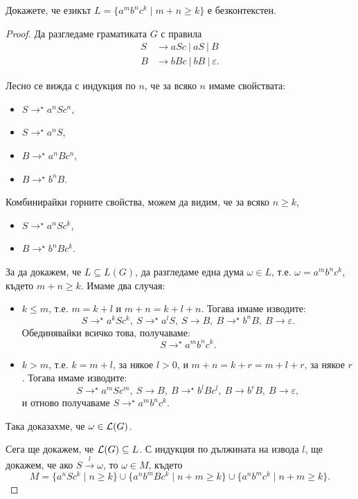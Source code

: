 \begin{problem}
  Докажете, че езикът $L = \{a^mb^nc^k\mid m+n \geq k\}$ е безконтекстен.
\end{problem}
\begin{proof}
  Да разгледаме граматиката $G$ с правила
  \begin{align*}
    S& \rightarrow aSc\ |\ aS\ |\ B\\
    B& \rightarrow bBc\ |\  bB\ |\ \varepsilon.
  \end{align*}
  
  Лесно се вижда с индукция по $n$, че за всяко $n$ имаме свойствата:
  \begin{itemize}
  \item 
    $S \rightarrow^\star a^nSc^n$,
  \item
    $S \rightarrow^\star a^nS$,
  \item
    $B \rightarrow^\star a^nBc^n$,
  \item
    $B \rightarrow^\star b^nB$.
  \end{itemize}
  Комбинирайки горните свойства, можем да видим, че за всяко $n \geq k$,
  \begin{itemize}
  \item 
    $S \rightarrow^\star a^nSc^k$,
  \item
    $B \rightarrow^\star b^nBc^k$.
  \end{itemize}
  За да докажем, че $L \subseteq L(G)$, 
  да разгледаме една дума $\omega \in L$, т.е. $\omega = a^mb^nc^k$, където $m+n \geq k$.
  Имаме два случая:
  \begin{itemize}
  \item 
    $k \leq m$, т.е. $m = k+l$ и $m+n = k+l+n$.
    Тогава имаме изводите:
    \[S \rightarrow^\star a^kSc^k,\ S \rightarrow^\star a^lS,\ S \rightarrow B,\ B \rightarrow^\star b^nB,\ B \rightarrow \varepsilon.\]
    Обединявайки всичко това, получаваме:
    \[S \rightarrow^\star a^mb^nc^k.\]
  \item
    $k > m$, т.е. $k = m+l$, за някое $l > 0$, и $m+n = k+r = m+l+r$, за някое $r$.
    Тогава имаме изводите:
    \[S \rightarrow^\star a^mSc^m,\ S\rightarrow B,\ B\rightarrow^\star b^lBc^l,\ B\rightarrow b^rB,\ B\rightarrow\varepsilon,\]
    и отново получаваме $S \rightarrow^\star a^mb^nc^k$.
  \end{itemize}
  Така доказахме, че $\omega \in \mathcal{L}(G)$.
  
  Сега ще докажем, че $\mathcal{L}(G) \subseteq L$.
  С индукция по дължината на извода $l$,
  ще докажем, че ако $S \stackrel{l}{\rightarrow}\omega$, то $\omega \in M$, където
  \[M = \{a^nSc^k\mid n\geq k\}\cup\{a^nb^mBc^k\mid n+m\geq k\}\cup\{a^nb^mc^k\mid n+m\geq k\}.\]
  

\end{proof}
